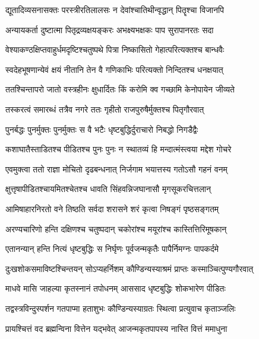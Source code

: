 {द्यूतादिव्यसनासक्तः परस्त्रीरतिलालसः}
{न देवांश्चातिथीन्वृद्धान् पितॄश्चा विजानपि} %

\twolineshloka
{अन्यायकर्ता दुष्टात्मा पितृद्रव्यक्षयङ्करः}
{अभक्ष्यभक्षकः पाप सुरापानरतः सदा} %

\twolineshloka
{वेश्याकण्ठक्षिप्तवाहुर्धमदृष्टिश्चतुष्पथे}
{पित्रा निष्कासितो गेहात्परित्यक्तश्च बान्धवैः} %

\twolineshloka
{स्वदेहभूषणान्येवं क्षयं नीतानि तेन वै}
{गणिकाभिः परित्यक्तो निन्दितश्च धनक्षयात्} %

\twolineshloka
{ततश्चिन्तापरो जातो वस्त्रहीनः क्षुधार्दितः}
{किं करोमि क्व गच्छामि केनोपायेन जीव्यते} %

\twolineshloka
{तस्करत्वं समारब्धं तत्रैव नगरे ततः}
{गृहीतो राजपुरुषैर्मुक्तश्च पितृगौरवात्} %

\twolineshloka
{पुनर्बद्धः पुनर्मुक्तः पुनर्मुक्तः स वै भटैः}
{धृष्टबुद्धिर्दुराचारो निबद्धो निगडैद्वैः} %

\twolineshloka
{कशाघातैस्ताडितश्च पीडितश्च पुनः पुनः}
{न स्थातव्यं हि मन्दात्मंस्त्वया मद्देश गोचरे} %

\twolineshloka
{एवमुक्त्वा ततो राज्ञा मोचितो दृढबन्धनात्}
{निर्जगाम भयात्तस्य गतोऽसौ गहनं वनम्} %

\twolineshloka
{क्षुत्तृषापीडितश्चायमितश्चेतश्च धावति}
{सिंहवन्निजघानासौ मृगसूकरचित्तलान्} %

\twolineshloka
{आमिषाहारनिरतो वने तिष्ठति सर्वदा}
{शरासने शरं कृत्वा निषङ्गं पृष्ठसङ्गतम्} %

\twolineshloka
{अरण्यचारिणो हन्ति दक्षिणश्च चतुष्पदान्}
{चकोरांश्च मयूरांश्च कास्तित्तिरिमूषकान्} %

\twolineshloka
{एतानन्यान् हन्ति नित्यं धृष्टबुद्धिः स निर्घृणः}
{पूर्वजन्मकृतैः पापैर्निमग्नः पापकर्दमे} %

\twolineshloka
{दुःखशोकसमाविष्टश्चिन्तयन् सोऽप्यहर्निशम्}
{कौण्डिन्यस्याश्रमं प्राप्तः कस्माञ्चित्पुण्यगौरवात्} %

\twolineshloka
{माधवे मासि जाहल्या कृतस्नानं तपोधनम्}
{आससाद धृष्टबुद्धिः शोकभारेण पीडितः} %

\twolineshloka
{तद्वस्त्रविन्दुस्पर्शन गतपाप्मा हताशुभः}
{कौण्डिन्यस्याग्रतः स्थित्वा प्रत्युवाच कृताञ्जलिः} %


\twolineshloka
{प्रायश्चित्तं वद ब्रह्मन्विना वित्तेन यद्भवेत्}
{आजन्मकृतपापस्य नास्ति वित्तं ममाधुना} %


